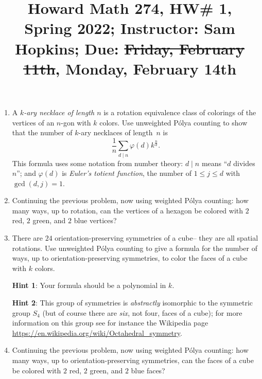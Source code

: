 \documentclass[11pt]{article}
\title{Howard Math 274, HW\# 1, \\ {\normalsize Spring 2022; Instructor: Sam Hopkins; Due: \st{Friday, February 11th}, Monday, February 14th}}
\date{}
\begin{document}
\maketitle

\thispagestyle{empty}

\vspace{-1.5cm}

\begin{enumerate}

\item A \emph{$k$-ary necklace of length $n$} is a rotation equivalence class of colorings of the vertices of an $n$-gon with $k$ colors. Use unweighted P\'{o}lya counting to show that the number of $k$-ary necklaces of length~$n$ is
\[ \frac{1}{n}\sum_{d\mid n} \varphi(d) k^{\frac{n}{d}}.\]
This formula uses some notation from number theory: $d \mid n$ means ``$d$ divides $n$''; and $\varphi(d)$ is \emph{Euler's totient function}, the number of $1 \leq j \leq d$ with $\gcd(d,j)=1$.

\item Continuing the previous problem, now using weighted P\'{o}lya counting: how many ways, up to rotation, can the vertices of a hexagon be colored with $2$ red, $2$ green, and $2$ blue vertices?

\item There are $24$ orientation-preserving symmetries of a cube-- they are all spatial rotations. Use unweighted P\'{o}lya counting to give a formula for the number of ways, up to orientation-preserving symmetries, to color the faces of a cube with $k$ colors. 

{\bf Hint 1}: Your formula should be a polynomial in $k$.

{\bf Hint 2}: This group of symmetries is \emph{abstractly} isomorphic to the symmetric group $S_4$ (but of course there are \emph{six}, not four, faces of a cube); for more information on this group see for instance the Wikipedia page \url{https://en.wikipedia.org/wiki/Octahedral_symmetry}.

\item Continuing the previous problem, now using weighted P\'{o}lya counting: how many ways, up to orientation-preserving symmetries, can the faces of a cube be colored with $2$ red, $2$ green, and $2$ blue faces?


\end{enumerate}
\end{document}
